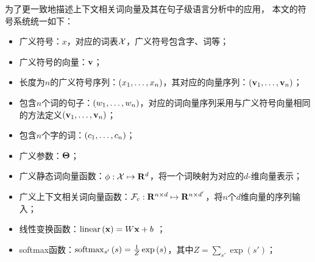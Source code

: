 \newcommand{\elmochinesetranslation}{\text{基于语言模型的上下文相关词向量}}
\newcommand{\finetunechinesetranslation}{\text{精调参数}}
\begin{denotation}

为了更一致地描述上下文相关词向量及其在句子级语言分析中的应用，
本文的符号系统统一如下：

\begin{itemize}
\item 广义符号：$x$，对应的词表$\mathcal{X}$，广义符号包含字、词等；
\item 广义符号的向量：$\mathbf{v}$；
\item 长度为$n$的广义符号序列：$\left(x_1, \dots, x_n\right)$，其对应的向量序列：$\left(\mathbf{v}_1, \dots, \mathbf{v}_n\right)$；
\item 包含$n$个词的句子：$\left(w_1, \dots, w_n\right)$，对应的词向量序列采用与广义符号向量相同的方法定义$\left(\mathbf{v}_1, \dots, \mathbf{v}_n\right)$；
\item 包含$n$个字的词：$\left(c_1, \dots, c_n\right)$；
\item 广义参数：$\mathbf{\Theta}$；
\item 广义静态词向量函数：$\phi: \mathcal{X} \mapsto \mathbf{R}^d$，将一个词映射为对应的$d$-维向量表示；
\item 广义上下文相关词向量函数：$\mathcal{F}_{c}: \mathbf{R}^{n \times d} \mapsto \mathbf{R}^{n \times d'}$，将$n$个$d$维向量的序列输入；
\item 线性变换函数：$\text{linear}\left( \mathbf{x} \right) = W \mathbf{x} + b$ ；
\item softmax函数：$\operatorname*{softmax}_{s'}{(s)} = \frac{1}{Z} \exp \left(s\right)$，其中$Z=\sum_{s'} \exp \left(s'\right)$；

\end{itemize}

\end{denotation}
